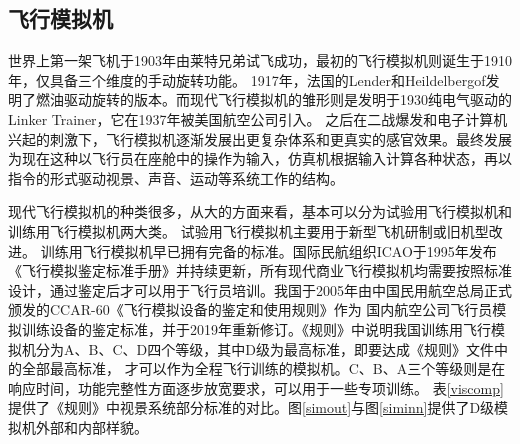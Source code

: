 \subsection{飞行模拟机}
世界上第一架飞机于1903年由莱特兄弟试飞成功，最初的飞行模拟机则诞生于1910年，仅具备三个维度的手动旋转功能\cite{simhis1}。 1917年，法国的Lender和Heildelbergof发明了燃油驱动旋转的版本\cite{simhis2}。而现代飞行模拟机的雏形则是发明于1930纯电气驱动的Linker Trainer，它在1937年被美国航空公司引入。
之后在二战爆发和电子计算机兴起的刺激下，飞行模拟机逐渐发展出更复杂体系和更真实的感官效果\cite{simulator2}。最终发展为现在这种以飞行员在座舱中的操作为输入，仿真机根据输入计算各种状态，再以指令的形式驱动视景、声音、运动等系统工作的结构。
\par
现代飞行模拟机的种类很多，从大的方面来看，基本可以分为试验用飞行模拟机和训练用飞行模拟机两大类。
试验用飞行模拟机主要用于新型飞机研制或旧机型改进。
训练用飞行模拟机早已拥有完备的标准。国际民航组织ICAO于1995年发布《飞行模拟鉴定标准手册》并持续更新\cite{normalize2}，所有现代商业飞行模拟机均需要按照标准设计，通过鉴定后才可以用于飞行员培训。我国于2005年由中国民用航空总局正式颁发的CCAR-60《飞行模拟设备的鉴定和使用规则》作为
国内航空公司飞行员模拟训练设备的鉴定标准，并于2019年重新修订\cite{normalize1}。《规则》中说明我国训练用飞行模拟机分为A、B、C、D四个等级，其中D级为最高标准，即要达成《规则》文件中的全部最高标准，
才可以作为全程飞行训练的模拟机。C、B、A三个等级则是在响应时间，功能完整性方面逐步放宽要求，可以用于一些专项训练。
表\ref{viscomp}提供了《规则》中视景系统部分标准的对比。图\ref{simout}与图\ref{siminn}提供了D级模拟机外部和内部样貌。
